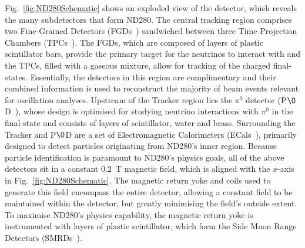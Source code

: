 Fig.~\ref{fig:ND280Schematic} shows an exploded view of the detector, which reveals the many subdetectors that form ND280.  The central tracking region comprises two Fine-Grained Detectors (FGDs~\cite{Amaudruz20121}) sandwiched between three Time Projection Chambers (TPCs~\cite{Abgrall201125}). The FGDs, which are composed of layers of plastic scintillator bars, provide the primary target for the neutrinos to interact with and the TPCs, filled with a gaseous mixture, allow for tracking of the charged final-states.  Essentially, the detectors in this region are complimentary and their combined information is used to reconstruct the majority of beam events relevant for oscillation analyses.  Upstream of the Tracker region lies the $\pi^0$ detector (P$\O$D~\cite{Assylbekov201248}), whose design is optimised for studying neutrino interactions with $\pi^0$ in the final-state and consists of layers of scintillator, water and brass.  Surrounding the Tracker and P$\O$D are a set of Electromagnetic Calorimeters (ECals~\cite{1748-0221-8-10-P10019}), primarily designed to detect particles originating from ND280's inner region.  Because particle identification is paramount to ND280's physics goals, all of the above detectors sit in a constant 0.2~T magnetic field, which is aligned with the $x$-axis in Fig.~\ref{fig:ND280Schematic}.  The magnetic return yoke and coils used to generate this field encompass the entire detector, allowing a constant field to be maintained within the detector, but greatly minimising the field's outside extent.  To maximise ND280's physics capability, the magnetic return yoke is instrumented with layers of plastic scintillator, which form the Side Muon Range Detectors (SMRDs~\cite{Aoki2013135}).


